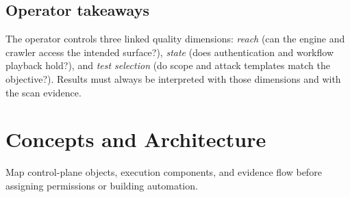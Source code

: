 \documentclass[11pt,letterpaper,oneside]{scrreprt}
\newcommand{\chapterlead}[1]{\begin{tcolorbox}[enhanced,colback=R7Light,colframe=R7Light,boxrule=0pt,borderline west={3pt}{0pt}{R7Orange},arc=0pt,left=9pt,right=9pt,top=7pt,bottom=7pt]#1\end{tcolorbox}}
\begin{document}
\section{Operator takeaways}
The operator controls three linked quality dimensions: \emph{reach} (can the engine and crawler access the intended surface?), \emph{state} (does authentication and workflow playback hold?), and \emph{test selection} (do scope and attack templates match the objective?). Results must always be interpreted with those dimensions and with the scan evidence.

\chapter{Concepts and Architecture}
\chapterlead{Map control-plane objects, execution components, and evidence flow before assigning permissions or building automation.}
\end{document}
